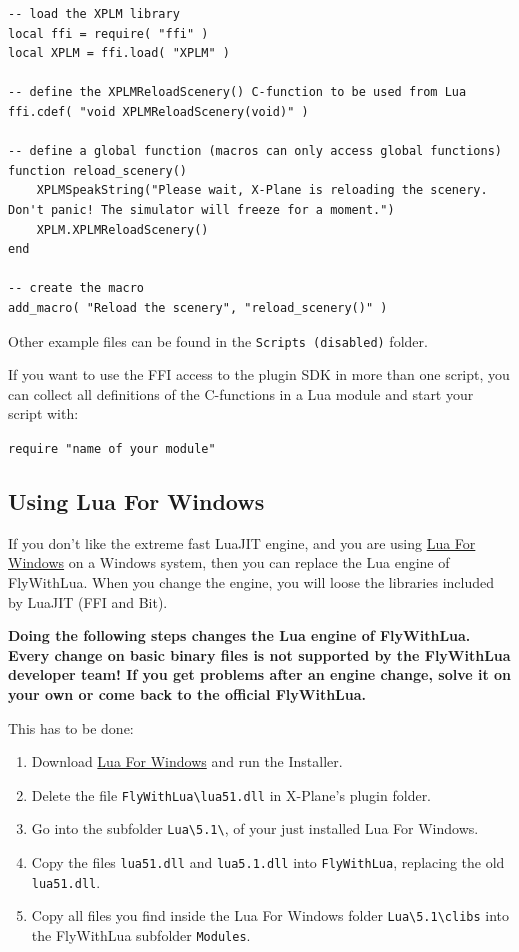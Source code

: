 \documentclass[11pt,parskip=half,a4paper]{scrartcl}
\begin{document}
\begin{lstlisting}[firstnumber=12]
-- load the XPLM library
local ffi = require( "ffi" )
local XPLM = ffi.load( "XPLM" )

-- define the XPLMReloadScenery() C-function to be used from Lua
ffi.cdef( "void XPLMReloadScenery(void)" )

-- define a global function (macros can only access global functions)
function reload_scenery()
    XPLMSpeakString("Please wait, X-Plane is reloading the scenery. Don't panic! The simulator will freeze for a moment.")
    XPLM.XPLMReloadScenery()
end

-- create the macro
add_macro( "Reload the scenery", "reload_scenery()" )
\end{lstlisting}

Other example files can be found in the \verb|Scripts (disabled)| folder.

If you want to use the FFI access to the plugin SDK in more than one script, you can collect all definitions of the C-functions in a Lua module and start your script with:

\verb|require "name of your module"|

\newpage
\subsection{Using Lua For Windows}

If you don't like the extreme fast LuaJIT engine, and you are using \href{http://code.google.com/p/luaforwindows/}{Lua For Windows} on a Windows system, then you can replace the Lua engine of FlyWithLua. When you change the engine, you will loose the libraries included by LuaJIT (FFI and Bit).

\textbf{Doing the following steps changes the Lua engine of FlyWithLua. Every change on basic binary files is not supported by the FlyWithLua developer team! If you get problems after an engine change, solve it on your own or come back to the official FlyWithLua.}

This has to be done:

\begin{enumerate}
\item Download \href{http://code.google.com/p/luaforwindows/}{Lua For Windows} and run the Installer.
\item Delete the file \verb|FlyWithLua\lua51.dll| in X-Plane's plugin folder.
\item Go into the subfolder \verb|Lua\5.1\|, of your just installed Lua For Windows.
\item Copy the files \verb|lua51.dll| and \verb|lua5.1.dll| into \verb|FlyWithLua|, replacing the old \verb|lua51.dll|.
\item Copy all files you find inside the Lua For Windows folder \verb|Lua\5.1\clibs| into the FlyWithLua subfolder \verb|Modules|.
\end{enumerate}
\end{document}
